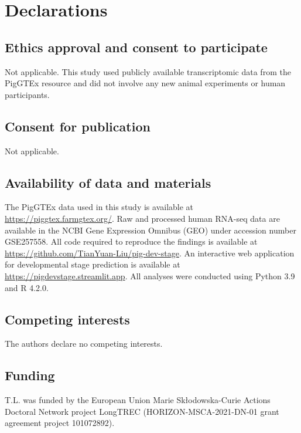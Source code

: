 \documentclass[10pt,a4paper]{article}
\begin{document}



\section*{Declarations}

\subsection*{Ethics approval and consent to participate}
Not applicable. This study used publicly available transcriptomic data from the PigGTEx resource and did not involve any new animal experiments or human participants.

\subsection*{Consent for publication}
Not applicable.

\subsection*{Availability of data and materials}
The PigGTEx data used in this study is available at \url{https://piggtex.farmgtex.org/}. Raw and processed human RNA-seq data are available in the NCBI Gene Expression Omnibus (GEO) under accession number GSE257558. All code required to reproduce the findings is available at \url{https://github.com/TianYuan-Liu/pig-dev-stage}. An interactive web application for developmental stage prediction is available at \url{https://pigdevstage.streamlit.app}. All analyses were conducted using Python 3.9 and R 4.2.0.

\subsection*{Competing interests}
The authors declare no competing interests.

\subsection*{Funding}
T.L. was funded by the European Union Marie Sk\l{}odowska-Curie Actions Doctoral Network project LongTREC (HORIZON-MSCA-2021-DN-01 grant agreement project 101072892).
\end{document}
